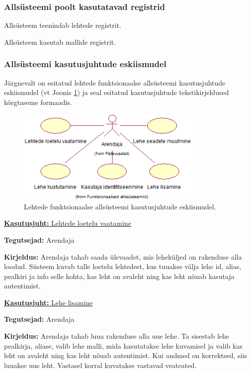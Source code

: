 \documentclass[a4paper,12pt]{article} %
\begin{document}
\subsubsection{Allsüsteemi poolt kasutatavad registrid}
Allsüsteem teenindab lehtede registrit.\par
Allsüsteem kasutab mallide registrit.
\subsubsection{Allsüsteemi kasutusjuhtude eskiismudel}
Järgnevalt on esitatud lehtede funktsionaalse allsüsteemi kasutusjuhtude eskiismudel (vt Joonis \ref{fig_lehtede_funktsionaalse_allsüsteemi_kasutusjuhtude_eskiismudel}) ja seal esitatud kasutusjuhtude tekstikirjeldused kõrgtaseme formaadis.
\begin{figure}[H]
\centering
\includegraphics[width=0.8\textwidth]{./diagrams/pages-subsystem-use-case-digram.png}
\caption{Lehtede funktsionaalse allsüsteemi kasutusjuhtude eskiismudel.}
\label{fig_lehtede_funktsionaalse_allsüsteemi_kasutusjuhtude_eskiismudel}
\end{figure}
\pagebreak
\underline{\textbf{Kasutusjuht:} Lehtede loetelu vaatamine}
\par
\textbf{Tegutsejad:} Arendaja
\par
\textbf{Kirjeldus:} Arendaja tahab saada ülevaadet, mis leheküljed on rakenduse alla loodud. Süsteem kuvab talle loetelu lehtedest, kus tuuakse välja lehe id, alias, pealkiri ja info selle kohta, kas leht on avaleht ning kas leht nõuab kasutaja autentimist.
\par

\underline{\textbf{Kasutusjuht:} Lehe lisamine}
\par
\textbf{Tegutsejad:} Arendaja
\par
\textbf{Kirjeldus:} Arendaja tahab luua rakenduse alla uue lehe. Ta sisestab lehe pealkirja, aliase, valib lehe malli, mida kasutatakse lehe kuvamisel ja valib kas leht on avaleht ning kas leht nõuab autentimist. Kui andmed on korrektsed, siis luuakse uus leht. Vastasel korral kuvatakse vastavad veateated.
\par
\end{document}
